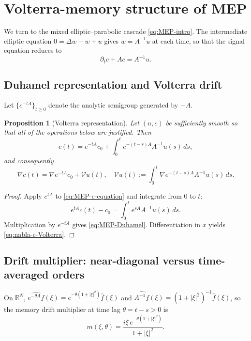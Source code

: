 \documentclass[11pt,reqno]{amsart}
\newtheorem{proposition}[theorem]{Proposition}
\theoremstyle{definition}
\theoremstyle{remark}
\newcommand{\R}{\mathbb{R}}
\newcommand{\Vop}{\mathcal{V}}
\begin{document}
\section{Volterra-memory structure of MEP}
\label{sec:MEP}

We turn to the mixed elliptic--parabolic cascade \eqref{eq:MEP-intro}. The intermediate elliptic equation $0=\Delta w-w+u$ gives $w=A^{-1}u$ at each time, so that the signal equation reduces to
\begin{equation}\label{eq:MEP-c-equation}
        \partial_t c+Ac=A^{-1}u.
\end{equation}

\subsection{Duhamel representation and Volterra drift}
\label{subsec:Duhamel}

Let $\{e^{-tA}\}_{t\ge 0}$ denote the analytic semigroup generated by $-A$.

\begin{proposition}[Volterra representation]\label{prop:MEP-Volterra}
Let $(u,c)$ be sufficiently smooth so that all of the operations below are justified. Then
\begin{equation}\label{eq:MEP-Duhamel}
        c(t)=e^{-tA}c_0+\int_0^t e^{-(t-s)A}A^{-1}u(s)\,ds,
\end{equation}
and consequently
\begin{equation}\label{eq:nabla-c-Volterra}
        \nabla c(t)=\nabla e^{-tA}c_0+\Vop u(t),
        \quad
        \Vop u(t):=\int_0^t \nabla e^{-(t-s)A}A^{-1}u(s)\,ds.
\end{equation}
\end{proposition}

\begin{proof}
Apply $e^{tA}$ to \eqref{eq:MEP-c-equation} and integrate from $0$ to $t$:
\[
        e^{tA}c(t)-c_0=\int_0^t e^{sA}A^{-1}u(s)\,ds.
\]
Multiplication by $e^{-tA}$ gives \eqref{eq:MEP-Duhamel}. Differentiation in $x$ yields \eqref{eq:nabla-c-Volterra}.
\end{proof}

\subsection{Drift multiplier: near-diagonal versus time-averaged orders}
\label{subsec:multiplier}

On $\R^{N}$, $\widehat{e^{-\theta A}f}(\xi)=e^{-\theta(1+|\xi|^{2})}\widehat f(\xi)$ and $\widehat{A^{-1}f}(\xi)=(1+|\xi|^{2})^{-1}\widehat f(\xi)$, so the memory drift multiplier at time lag $\theta=t-s>0$ is
\begin{equation}\label{eq:m-xi-theta}
        m(\xi,\theta)=\frac{i\xi\,e^{-\theta(1+|\xi|^{2})}}{1+|\xi|^{2}}.
\end{equation}
\end{document}
